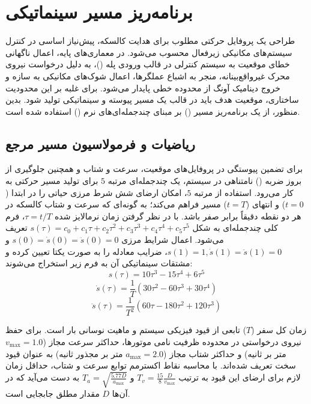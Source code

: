 \section{برنامه‌ریز مسیر سینماتیکی}
\label{sec:trajectory_planner}

طراحی یک پروفایل حرکتی مطلوب برای هدایت کالسکه، پیش‌نیاز اساسی در کنترل سیستم‌های مکانیکی زیرفعال محسوب می‌شود. در معماری‌های پایه، اعمال ناگهانی خطای موقعیت به سیستم کنترلی در قالب ورودی پله ()، به دلیل درخواست نیروی محرک غیرواقع‌بینانه، منجر به اشباع عملگرها، اعمال شوک‌های مکانیکی به سازه و خروج دینامیک آونگ از محدوده خطی پایدار می‌شود. برای غلبه بر این محدودیت ساختاری، موقعیت هدف باید در قالب یک مسیر پیوسته و سینماتیکی تولید شود. بدین منظور، از یک برنامه‌ریز مسیر () بر مبنای چندجمله‌ای‌های نرم () استفاده شده است.

\subsection{ریاضیات و فرمولاسیون مسیر مرجع}
برای تضمین پیوستگی در پروفایل‌های موقعیت، سرعت و شتاب و همچنین جلوگیری از بروز ضربه () نامتناهی در سیستم، یک چندجمله‌ای مرتبه $5$ برای تولید مسیر حرکتی به کار می‌رود. استفاده از مرتبه $5$، امکان ارضای شش شرط مرزی حیاتی را در ابتدا ($t=0$) و انتهای ($t=T$) مسیر فراهم می‌کند؛ به گونه‌ای که سرعت و شتاب کالسکه در هر دو نقطه دقیقاً برابر صفر باشد. با در نظر گرفتن زمان نرمالایز شده $\tau = t/T$، فرم کلی چندجمله‌ای به شکل $s(\tau) = c_0 + c_1\tau + c_2\tau^2 + c_3\tau^3 + c_4\tau^4 + c_5\tau^5$ تعریف می‌شود. اعمال شرایط مرزی $s(0)=\dot{s}(0)=\ddot{s}(0)=0$ و $s(1)=1, \dot{s}(1)=\ddot{s}(1)=0$، ضرایب معادله را به صورت یکتا تعیین کرده و مشتقات سینماتیکی آن به فرم زیر استخراج می‌شوند:
\begin{equation}
    s(\tau) = 10\tau^3 - 15\tau^4 + 6\tau^5
\end{equation}
\begin{equation}
    \dot{s}(\tau) = \frac{1}{T} \left( 30\tau^2 - 60\tau^3 + 30\tau^4 \right)
\end{equation}
\begin{equation}
    \ddot{s}(\tau) = \frac{1}{T^2} \left( 60\tau - 180\tau^2 + 120\tau^3 \right)
\end{equation}

زمان کل سفر ($T$) تابعی از قیود فیزیکی سیستم و ماهیت نوسانی بار است. برای حفظ نیروی درخواستی در محدوده ظرفیت نامی موتورها، حداکثر سرعت مجاز ($v_{\max} = 1.0$ متر بر ثانیه) و حداکثر شتاب مجاز ($a_{\max} = 2.0$ متر بر مجذور ثانیه) به عنوان قیود سخت تعریف شده‌اند. با محاسبه نقاط اکسترمم توابع سرعت و شتاب، حداقل زمان لازم برای ارضای این قیود به ترتیب $T_v = \frac{15}{8} \frac{D}{v_{\max}}$ و $T_a = \sqrt{\frac{5.77 D}{a_{\max}}}$ به دست می‌آید که در آن‌ها $D$ مقدار مطلق جابجایی است.

